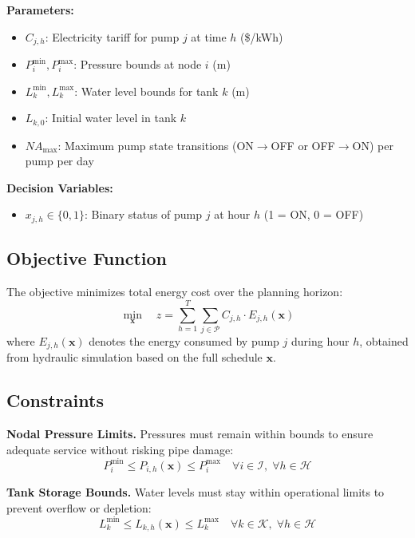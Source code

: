\documentclass[final,3p,twocolumn]{elsarticle}
\begin{document}
\textbf{Parameters:}
\begin{itemize}
	\item $C_{j,h}$: Electricity tariff for pump $j$ at time $h$ (\$/kWh)
	\item $P_{i}^{\min}, P_{i}^{\max}$: Pressure bounds at node $i$ (m)
	\item $L_{k}^{\min}, L_{k}^{\max}$: Water level bounds for tank $k$ (m)
	\item $L_{k,0}$: Initial water level in tank $k$
	\item $NA_{\max}$: Maximum pump state transitions (ON$\to$OFF or OFF$\to$ON) per pump per day
\end{itemize}

\textbf{Decision Variables:}
\begin{itemize}
	\item $x_{j,h} \in \{0, 1\}$: Binary status of pump $j$ at hour $h$ (1 = ON, 0 = OFF)
\end{itemize}

\subsection{Objective Function}

The objective minimizes total energy cost over the planning horizon:
\begin{equation}
	\min_{\mathbf{x}} \quad z = \sum_{h=1}^{T} \sum_{j \in \mathcal{P}} C_{j,h} \cdot E_{j,h}(\mathbf{x})
\end{equation}
where $E_{j,h}(\mathbf{x})$ denotes the energy consumed by pump $j$ during hour $h$, obtained from hydraulic simulation based on the full schedule $\mathbf{x}$.

\subsection{Constraints}

\textbf{Nodal Pressure Limits.} Pressures must remain within bounds to ensure adequate service without risking pipe damage:
\begin{equation}
	P_{i}^{\min} \le P_{i,h}(\mathbf{x}) \le P_{i}^{\max} \quad \forall i \in \mathcal{I}, \; \forall h \in \mathcal{H}
	\label{eq:pressure_limits}
\end{equation}

\textbf{Tank Storage Bounds.} Water levels must stay within operational limits to prevent overflow or depletion:
\begin{equation}
	L_{k}^{\min} \le L_{k,h}(\mathbf{x}) \le L_{k}^{\max} \quad \forall k \in \mathcal{K}, \; \forall h \in \mathcal{H}
	\label{eq:tank_bounds}
\end{equation}
\end{document}
